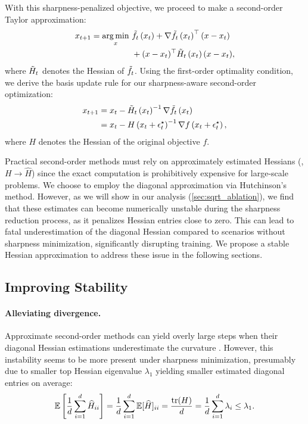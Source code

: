 With this sharpness-penalized objective, we proceed to make a second-order Taylor approximation: 
\begin{align*}
    x_{t+1} = \mathop{\rm arg\,min}_x~ & \Tilde{f}_{t}\left(x_t\right) + \nabla \Tilde{f}_{t}\left(x_t\right)^\top (x-x_t) \nonumber \\ 
    &+ (x-x_t)^\top \Tilde{H}_{t}\left(x_t\right) (x-x_t),
\end{align*}
where $\Tilde{H}_{t}$ denotes the Hessian of $\Tilde{f}_{t}$.
Using the first-order optimality condition, we derive the basis update rule for our sharpness-aware second-order optimization: 
\begin{align*}
    x_{t+1} &= x_t - \Tilde{H}_{t}\left(x_t\right)^{-1} \nabla \Tilde{f}_{t}\left(x_t\right) \nonumber \\
            &= x_t - H \left(x_t+ \epsilon_t^\star \right)^{-1} \nabla f \left(x_t+ \epsilon_t^\star \right),
\label{eq: update}
\end{align*}
where $H$ denotes the Hessian of the original objective $f$.

Practical second-order methods must rely on approximately estimated Hessians (\ie, $H \rightarrow \widehat{H}$) since the exact computation is prohibitively expensive for large-scale problems.
We choose to employ the diagonal approximation via Hutchinson's method.
However, as we will show in our analysis (\cref{sec:sqrt_ablation}), we find that these estimates can become numerically unstable during the sharpness reduction process, as it penalizes Hessian entries close to zero.
This can lead to fatal underestimation of the diagonal Hessian compared to scenarios without sharpness minimization, significantly disrupting training.
We propose a stable Hessian approximation to address these issue in the following sections.


\subsection{Improving Stability} \label{sec:method_stability}

\paragraph{Alleviating divergence.} \label{sec: alleviating divergence}
Approximate second-order methods can yield overly large steps when their diagonal Hessian estimations underestimate the curvature \citep{dauphin2015equilibrated}.
However, this instability seems to be more present under sharpness minimization, presumably due to smaller top Hessian eigenvalue $\lambda_1$ \citep{agarwala2023sam, shin2024critical} yielding smaller estimated diagonal entries on average: 
\begin{equation*}
    \mathbb{E}\left[\frac{1}{d}\sum_{i=1}^d{\widehat{H}_{ii}}\right] 
    = \frac{1}{d}\sum_{i=1}^d{\mathbb{E}[\widehat{H}]_{ii}} 
    = \frac{\operatorname{tr}(H)}{d} 
    = \frac{1}{d}\sum_{i=1}^d{\lambda_i} 
    \leq \lambda_1.
\end{equation*}


